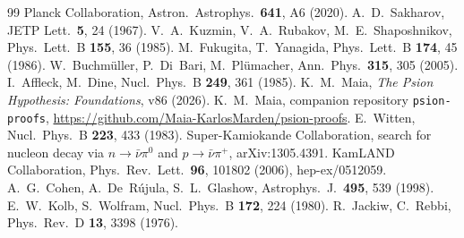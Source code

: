 \documentclass[11pt]{article}
\begin{document}
\begin{thebibliography}{99}
 Planck Collaboration, Astron.\ Astrophys.\ \textbf{641}, A6 (2020).
 A.~D.~Sakharov, JETP Lett.\ \textbf{5}, 24 (1967).
 V.~A.~Kuzmin, V.~A.~Rubakov, M.~E.~Shaposhnikov, Phys.\ Lett.\ B \textbf{155}, 36 (1985).
 M.~Fukugita, T.~Yanagida, Phys.\ Lett.\ B \textbf{174}, 45 (1986).
 W.~Buchm\"uller, P.~Di~Bari, M.~Pl\"umacher, Ann.\ Phys.\ \textbf{315}, 305 (2005).
 I.~Affleck, M.~Dine, Nucl.\ Phys.\ B \textbf{249}, 361 (1985).
 K.~M.~Maia, \emph{The Psion Hypothesis: Foundations}, v86 (2026).
 K.~M.~Maia, companion repository \texttt{psion-proofs}, \url{https://github.com/Maia-KarlosMarden/psion-proofs}.
 E.~Witten, Nucl.\ Phys.\ B \textbf{223}, 433 (1983).
 Super-Kamiokande Collaboration, search for nucleon decay via $n\to\bar\nu\pi^0$ and $p\to\bar\nu\pi^+$, arXiv:1305.4391.
 KamLAND Collaboration, Phys.\ Rev.\ Lett.\ \textbf{96}, 101802 (2006), hep-ex/0512059.
 A.~G.~Cohen, A.~De~R\'ujula, S.~L.~Glashow, Astrophys.\ J.\ \textbf{495}, 539 (1998).
 E.~W.~Kolb, S.~Wolfram, Nucl.\ Phys.\ B \textbf{172}, 224 (1980).
 R.~Jackiw, C.~Rebbi, Phys.\ Rev.\ D \textbf{13}, 3398 (1976).
\end{thebibliography}
\end{document}
